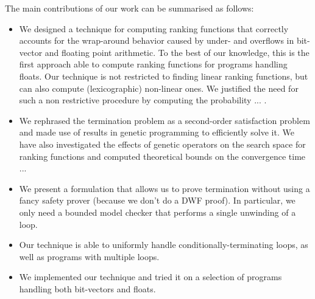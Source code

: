 \documentclass[preprint]{sigplanconf}
\theoremstyle{definition}
\begin{document}


 The main contributions of our work can be summarised as follows:
\begin{itemize}
\item We designed a technique for computing ranking functions that correctly accounts for the wrap-around behavior caused by under- and overflows in bit-vector and floating point arithmetic. To the best of our knowledge, this is the first approach able to compute ranking functions for programs handling floats. Our technique is not restricted to finding linear ranking functions, but can also compute (lexicographic) non-linear  ones. We justified the need for such a non restrictive procedure by computing the probability ... .
\item  We rephrased the termination problem as a second-order satisfaction problem and made 
use of results in genetic programming to efficiently solve it. We have also investigated the effects of genetic operators on the search space for ranking functions and computed theoretical 
bounds on the convergence time ...
\item We present a formulation that allows us to prove termination without using a fancy safety prover (because
we don't do a DWF proof).  In particular,
we only need a bounded model checker that performs a single unwinding of a loop.
\item Our technique is able to uniformly handle conditionally-terminating loops, as well as programs with
multiple loops.
\item We implemented our technique and tried it on a selection of programs handling both bit-vectors and floats.
\end{itemize}


\end{document}
